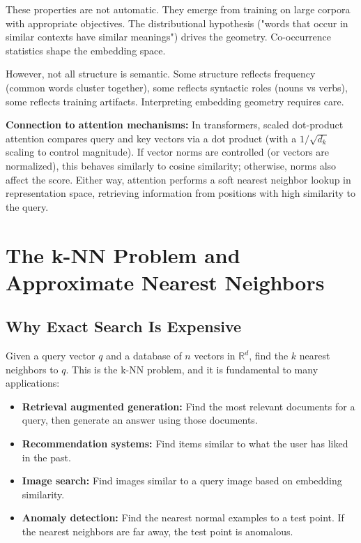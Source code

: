 \vspace{1em}

These properties are not automatic. They emerge from training on large corpora with appropriate objectives. The distributional hypothesis ("words that occur in similar contexts have similar meanings") drives the geometry. Co-occurrence statistics shape the embedding space.

\vspace{1em}

However, not all structure is semantic. Some structure reflects frequency (common words cluster together), some reflects syntactic roles (nouns vs verbs), some reflects training artifacts. Interpreting embedding geometry requires care.

\vspace{1em}

\textbf{Connection to attention mechanisms:} In transformers, scaled dot-product attention compares query and key vectors via a dot product (with a $1/\sqrt{d_k}$ scaling to control magnitude). If vector norms are controlled (or vectors are normalized), this behaves similarly to cosine similarity; otherwise, norms also affect the score. Either way, attention performs a soft nearest neighbor lookup in representation space, retrieving information from positions with high similarity to the query.

\vspace{2em}

\section{The k-NN Problem and Approximate Nearest Neighbors}

\subsection{Why Exact Search Is Expensive}

Given a query vector $q$ and a database of $n$ vectors in $\mathbb{R}^d$, find the $k$ nearest neighbors to $q$. This is the k-NN problem, and it is fundamental to many applications:

\begin{itemize}
\item \textbf{Retrieval augmented generation:} Find the most relevant documents for a query, then generate an answer using those documents.

\item \textbf{Recommendation systems:} Find items similar to what the user has liked in the past.

\item \textbf{Image search:} Find images similar to a query image based on embedding similarity.

\item \textbf{Anomaly detection:} Find the nearest normal examples to a test point. If the nearest neighbors are far away, the test point is anomalous.
\end{itemize}


